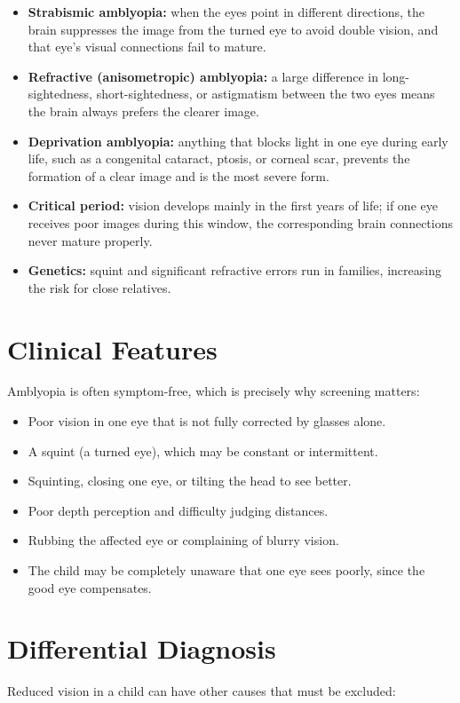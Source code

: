 \begin{itemize}
    \item \textbf{Strabismic amblyopia:} when the eyes point in different directions, the brain suppresses the image from the turned eye to avoid double vision, and that eye's visual connections fail to mature.
    \item \textbf{Refractive (anisometropic) amblyopia:} a large difference in long-sightedness, short-sightedness, or astigmatism between the two eyes means the brain always prefers the clearer image.
    \item \textbf{Deprivation amblyopia:} anything that blocks light in one eye during early life, such as a congenital cataract, ptosis, or corneal scar, prevents the formation of a clear image and is the most severe form.
    \item \textbf{Critical period:} vision develops mainly in the first years of life; if one eye receives poor images during this window, the corresponding brain connections never mature properly.
    \item \textbf{Genetics:} squint and significant refractive errors run in families, increasing the risk for close relatives.
\end{itemize}

\section*{Clinical Features}
Amblyopia is often symptom-free, which is precisely why screening matters:

\begin{itemize}
    \item Poor vision in one eye that is not fully corrected by glasses alone.
    \item A squint (a turned eye), which may be constant or intermittent.
    \item Squinting, closing one eye, or tilting the head to see better.
    \item Poor depth perception and difficulty judging distances.
    \item Rubbing the affected eye or complaining of blurry vision.
    \item The child may be completely unaware that one eye sees poorly, since the good eye compensates.
\end{itemize}

\section*{Differential Diagnosis}
Reduced vision in a child can have other causes that must be excluded:

